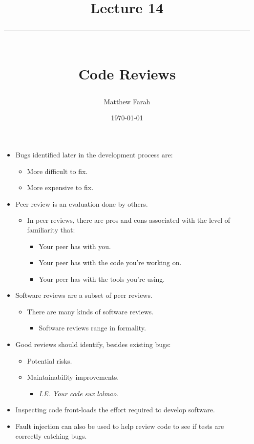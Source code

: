 \documentclass{article}
\date{
	\vspace{-.75em}
	{\large \today}
}
\title{
	\vspace*{-1.5em}
	{\Huge Lecture 14} \\
	\vspace{-1em}
	\rule{\textwidth/4}{.01em} \\
	\vspace{-.25em}
	{\Large Code Reviews}
	\vspace{-.75em}
}
\author{
	{\large Matthew Farah}
}
\begin{document}
\maketitle
\pagestyle{fancy}

\fi

\begin{itemize}
	\item Bugs identified later in the development process are:
	\begin{itemize}
		\item More difficult to fix.
		\item More expensive to fix.
	\end{itemize}
	\item Peer review is an evaluation done by others.
	\begin{itemize}
		\item In peer reviews, there are pros and cons associated with the level of familiarity that:
		\begin{itemize}
			\item Your peer has with you.
			\item Your peer has with the code you're working on.
			\item Your peer has with the tools you're using.
		\end{itemize}
	\end{itemize}
	\item Software reviews are a subset of peer reviews.
	\begin{itemize}
		\item There are many kinds of software reviews.
		\begin{itemize}
			\item Software reviews range in formality.
		\end{itemize}
	\end{itemize}
	\item Good reviews should identify, besides existing bugs:
	\begin{itemize}
		\item Potential risks.
		\item Maintainability improvements.
		\begin{itemize}
			\item \emph{I.E. Your code sux lolmao.}
		\end{itemize}
	\end{itemize}
	\item Inspecting code front-loads the effort required to develop software.
	\item Fault injection can also be used to help review code to see if tests are correctly catching bugs.
\end{itemize}

\ifdefined\iscombined
	\newpage
\else
	
\end{document}

